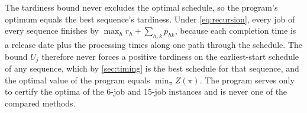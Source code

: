 \sumpara The tardiness bound never excludes the optimal schedule, so the program's optimum equals the best sequence's tardiness. \sumparaend
\fin Under \eqref{eq:recursion}, every job of every sequence finishes by $\max_h r_h + \sum_{h,k} p_{hk}$, because each completion time is a release date plus the processing times along one path through the schedule. \fine
\fin The bound $U_j$ therefore never forces a positive tardiness on the earliest-start schedule of any sequence, which by \cref{sec:timing} is the best schedule for that sequence, and the optimal value of the program equals $\min_\pi Z(\pi)$. \fine
\fin The program serves only to certify the optima of the 6-job and 15-job instances and is never one of the compared methods. \fine
